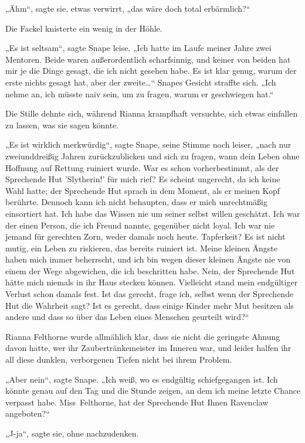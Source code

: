 {„Ähm“, sagte sie, etwas verwirrt, „das wäre doch total erbärmlich?“

Die Fackel knisterte ein wenig in der Höhle.

„Es ist seltsam“, sagte Snape leise. „Ich hatte im Laufe meiner Jahre zwei Mentoren. Beide waren außerordentlich scharfsinnig, und keiner von beiden hat mir je die Dinge gesagt, die ich nicht gesehen habe. Es ist klar genug, warum der erste nichts gesagt hat, aber der zweite…“ Snapes Gesicht straffte sich. „Ich nehme an, ich müsste naiv sein, um zu fragen, warum er geschwiegen hat.“

Die Stille dehnte sich, während Rianna krampfhaft versuchte, sich etwas einfallen zu lassen, was sie sagen könnte.

„Es ist wirklich merkwürdig“, sagte Snape, seine Stimme noch leiser, „nach nur zweiunddreißig Jahren zurückzublicken und sich zu fragen, wann dein Leben ohne Hoffnung auf Rettung ruiniert wurde. War es schon vorherbestimmt, als der Sprechende Hut 'Slytherin!' für mich rief? Es scheint ungerecht, da ich keine Wahl hatte; der Sprechende Hut sprach in dem Moment, als er meinen Kopf berührte. Dennoch kann ich nicht behaupten, dass er mich unrechtmäßig einsortiert hat. Ich habe das Wissen nie um seiner selbst willen geschätzt. Ich war der einen Person, die ich Freund nannte, gegenüber nicht loyal. Ich war nie jemand für gerechten Zorn, weder damals noch heute. Tapferkeit? Es ist nicht mutig, ein Leben zu riskieren, das bereits ruiniert ist. Meine kleinen Ängste haben mich immer beherrscht, und ich bin wegen dieser kleinen Ängste nie von einem der Wege abgewichen, die ich beschritten habe. Nein, der Sprechende Hut hätte mich niemals in ihr Haus stecken können. Vielleicht stand mein endgültiger Verlust schon damals fest. Ist das gerecht, frage ich, selbst wenn der Sprechende Hut die Wahrheit sagt? Ist es gerecht, dass einige Kinder mehr Mut besitzen als andere und dass so über das Leben eines Menschen geurteilt wird?“

Rianna Felthorne wurde allmählich klar, dass sie nicht die geringste Ahnung davon hatte, wer ihr Zaubertränkemeister im Inneren war, und leider halfen ihr all diese dunklen, verborgenen Tiefen nicht bei ihrem Problem.

„Aber nein“, sagte Snape. „Ich weiß, wo es endgültig schiefgegangen ist. Ich könnte genau auf den Tag und die Stunde zeigen, an dem ich meine letzte Chance verpasst habe. Miss~Felthorne, hat der Sprechende Hut Ihnen Ravenclaw angeboten?“

„J-ja“, sagte sie, ohne nachzudenken.

}
